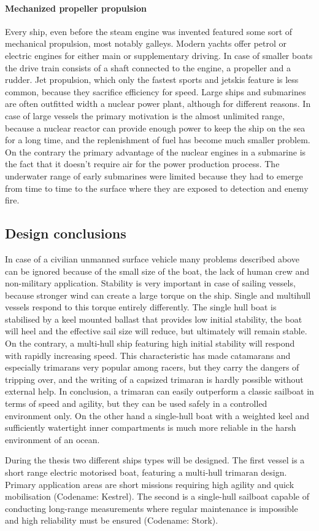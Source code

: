 \paragraph{Mechanized propeller propulsion}

Every ship, even before the steam engine was invented featured some sort of mechanical propulsion, most notably galleys. Modern yachts offer petrol or electric engines for either main or supplementary driving. In case of smaller boats the drive train consists of a shaft connected to the engine, a propeller and a rudder. Jet propulsion, which only the fastest sports and jetskis feature is less common, because they sacrifice efficiency for speed.
Large ships and submarines are often outfitted width a nuclear power plant, although for different reasons. In case of large vessels the primary motivation is the almost unlimited range, because a nuclear reactor can provide enough power to keep the ship on the sea for a long time, and the replenishment of fuel has become much smaller problem. On the contrary the primary advantage of the nuclear engines in a submarine is the fact that it doesn't require air for the power production process. The underwater range of early submarines were limited because they had to emerge from time to time to the surface where they are exposed to detection and enemy fire.

\subsection{Design conclusions}

In case of a civilian unmanned surface vehicle many problems described above can be ignored because of the small size of the boat, the lack of human crew and non-military application.
Stability is very important in case of sailing vessels, because stronger wind can create a large torque on the ship. Single and multihull vessels respond to this torque entirely differently. The single hull boat is stabilised by a keel mounted ballast that provides low initial stability, the boat will heel and the effective sail size will reduce, but ultimately will remain stable. On the contrary, a multi-hull ship featuring high initial stability will respond with rapidly increasing speed. This characteristic has made catamarans and especially trimarans very popular among racers, but they carry the dangers of tripping over, and the writing of a capsized trimaran is hardly possible without external help. In conclusion, a  trimaran can easily outperform a classic sailboat in terms of speed and agility, but they can be used safely in a controlled environment only. On the other hand a single-hull boat with a weighted keel and sufficiently watertight inner compartments is much more reliable in the harsh environment of an ocean.

During the thesis two different ships types will be designed. The first vessel is a short range electric motorised boat, featuring a multi-hull trimaran design. Primary application areas are short missions requiring high agility and quick mobilisation (Codename: Kestrel). The second is a single-hull sailboat capable of conducting long-range measurements where regular maintenance is impossible and high reliability must be ensured (Codename: Stork).

